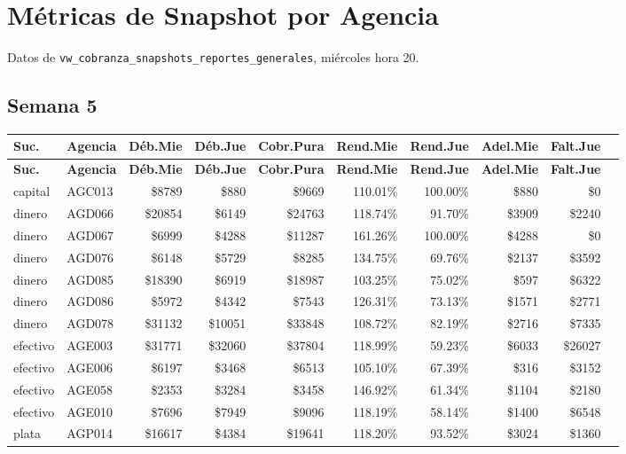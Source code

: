 \documentclass[11pt,a4paper]{article}
\newcommand{\money}[1]{\$\num{#1}}
\begin{document}
\newpage

\section{M\'etricas de Snapshot por Agencia}

Datos de \texttt{vw\_cobranza\_snapshots\_reportes\_generales}, mi\'ercoles hora 20.

\subsection{Semana 5}


\begin{center}
\renewcommand{\arraystretch}{1.2}
\footnotesize
\begin{longtable}{llrrrrrrrr}
\toprule
\textbf{Suc.} & \textbf{Agencia}
  & {\textbf{D\'eb.Mie}} & {\textbf{D\'eb.Jue}} & {\textbf{Cobr.Pura}}
  & {\textbf{Rend.Mie}} & {\textbf{Rend.Jue}}
  & {\textbf{Adel.Mie}} & {\textbf{Falt.Jue}} \\
\midrule
\endfirsthead
\toprule
\textbf{Suc.} & \textbf{Agencia}
  & {\textbf{D\'eb.Mie}} & {\textbf{D\'eb.Jue}} & {\textbf{Cobr.Pura}}
  & {\textbf{Rend.Mie}} & {\textbf{Rend.Jue}}
  & {\textbf{Adel.Mie}} & {\textbf{Falt.Jue}} \\
\midrule
\endhead
capital & AGC013 & \money{8789} & \money{880} & \money{9669} & 110.01\% & 100.00\% & \money{880} & \money{0} \\
dinero & AGD066 & \money{20854} & \money{6149} & \money{24763} & 118.74\% & 91.70\% & \money{3909} & \money{2240} \\
dinero & AGD067 & \money{6999} & \money{4288} & \money{11287} & 161.26\% & 100.00\% & \money{4288} & \money{0} \\
dinero & AGD076 & \money{6148} & \money{5729} & \money{8285} & 134.75\% & 69.76\% & \money{2137} & \money{3592} \\
dinero & AGD085 & \money{18390} & \money{6919} & \money{18987} & 103.25\% & 75.02\% & \money{597} & \money{6322} \\
dinero & AGD086 & \money{5972} & \money{4342} & \money{7543} & 126.31\% & 73.13\% & \money{1571} & \money{2771} \\
dinero & AGD078 & \money{31132} & \money{10051} & \money{33848} & 108.72\% & 82.19\% & \money{2716} & \money{7335} \\
efectivo & AGE003 & \money{31771} & \money{32060} & \money{37804} & 118.99\% & 59.23\% & \money{6033} & \money{26027} \\
efectivo & AGE006 & \money{6197} & \money{3468} & \money{6513} & 105.10\% & 67.39\% & \money{316} & \money{3152} \\
efectivo & AGE058 & \money{2353} & \money{3284} & \money{3458} & 146.92\% & 61.34\% & \money{1104} & \money{2180} \\
efectivo & AGE010 & \money{7696} & \money{7949} & \money{9096} & 118.19\% & 58.14\% & \money{1400} & \money{6548} \\
plata & AGP014 & \money{16617} & \money{4384} & \money{19641} & 118.20\% & 93.52\% & \money{3024} & \money{1360} \\


\end{longtable}
\end{center}
\end{document}
